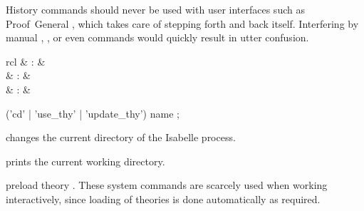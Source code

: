 \begin{isabellebody}
\begin{isamarkuptext}
  \begin{warn}
    History commands should never be used with user interfaces such as
    Proof~General \cite{proofgeneral,Aspinall:TACAS:2000}, which takes
    care of stepping forth and back itself.  Interfering by manual
    \hyperlink{command.undo}{\mbox{}}, \hyperlink{command.redo}{\mbox{}}, or even \hyperlink{command.kill}{\mbox{}}
    commands would quickly result in utter confusion.
  \end{warn}%
\end{isamarkuptext}%
\isamarkuptrue%
%
\isamarkuptrue%
%
\begin{isamarkuptext}%
\begin{matharray}{rcl}
    \hypertarget{command.cd}{\hyperlink{command.cd}{\mbox{}}}\isa{{\isachardoublequote}\isactrlsup {\isacharasterisk}{\isachardoublequote}} & : & \isarkeep{\cdot} \\
    \hypertarget{command.pwd}{\hyperlink{command.pwd}{\mbox{}}}\isa{{\isachardoublequote}\isactrlsup {\isacharasterisk}{\isachardoublequote}} & : & \isarkeep{\cdot} \\
    \hypertarget{command.use-thy}{\hyperlink{command.use-thy}{\mbox{}}}\isa{{\isachardoublequote}\isactrlsup {\isacharasterisk}{\isachardoublequote}} & : & \isarkeep{\cdot} \\
  \end{matharray}

  \begin{rail}
    ('cd' | 'use\_thy' | 'update\_thy') name
    ;
  \end{rail}

  \begin{descr}

  \item [\hyperlink{command.cd}{\mbox{\isa{\isacommand{cd}}}}~\isa{path}] changes the current directory
  of the Isabelle process.

  \item [\hyperlink{command.pwd}{\mbox{\isa{\isacommand{pwd}}}}] prints the current working directory.

  \item [\hyperlink{command.use-thy}{\mbox{\isa{\isacommand{use{\isacharunderscore}thy}}}}~\isa{A}] preload theory .
  These system commands are scarcely used when working interactively,
  since loading of theories is done automatically as required.

  \end{descr}%
\end{isamarkuptext}%
\isamarkuptrue%
%
\isadelimtheory
%
\endisadelimtheory
%
\isatagtheory
{}\isamarkupfalse%
%
\endisatagtheory
{\isafoldtheory}%
%
\isadelimtheory
%
\endisadelimtheory
\isanewline
\end{isabellebody}%
